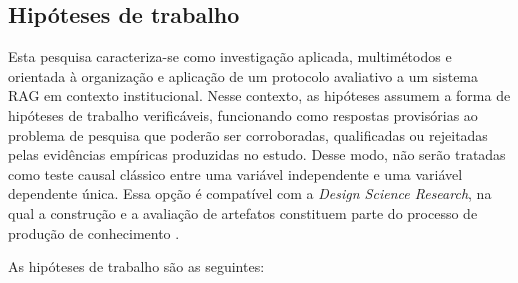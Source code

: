 \subsection{Hipóteses de trabalho}

Esta pesquisa caracteriza-se como investigação aplicada, multimétodos e orientada à organização e aplicação de um protocolo avaliativo a um sistema RAG em contexto institucional. Nesse contexto, as hipóteses assumem a forma de hipóteses de trabalho verificáveis, funcionando como respostas provisórias ao problema de pesquisa que poderão ser corroboradas, qualificadas ou rejeitadas pelas evidências empíricas produzidas no estudo. Desse modo, não serão tratadas como teste causal clássico entre uma variável independente e uma variável dependente única. Essa opção é compatível com a \textit{Design Science Research}, na qual a construção e a avaliação de artefatos constituem parte do processo de produção de conhecimento \parencite{hevnerEtAl2004designScience,peffersEtAl2007dsrm}.

As hipóteses de trabalho são as seguintes:

